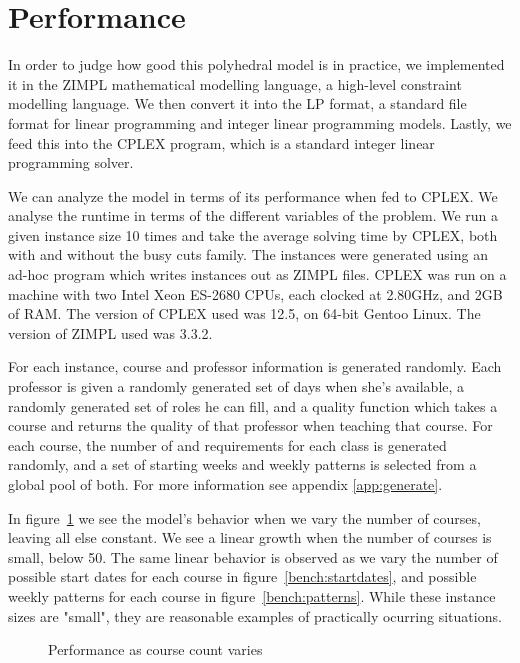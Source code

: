 \newpage
\section{Performance}

In order to judge how good this polyhedral model is in practice, we implemented it in the ZIMPL mathematical modelling language, a high-level constraint modelling language. We then convert it into the LP format, a standard file format for linear programming and integer linear programming models. Lastly, we feed this into the CPLEX program, which is a standard integer linear programming solver.

We can analyze the model in terms of its performance when fed to CPLEX. We analyse the runtime in terms of the different variables of the problem. We run a given instance size 10 times and take the average solving time by CPLEX, both with and without the busy cuts family. The instances were generated using an ad-hoc program which writes instances out as ZIMPL files. CPLEX was run on a machine with two Intel Xeon ES-2680 CPUs, each clocked at 2.80GHz, and 2GB of RAM. The version of CPLEX used was 12.5, on 64-bit Gentoo Linux. The version of ZIMPL used was 3.3.2.

For each instance, course and professor information is generated randomly. Each professor is given a randomly generated set of days when she's available, a randomly generated set of roles he can fill, and a quality function which takes a course and returns the quality of that professor when teaching that course. For each course, the number of and requirements for each class is generated randomly, and a set of starting weeks and weekly patterns is selected from a global pool of both. For more information see appendix \ref{app:generate}.

In figure~\ref{bench:courses} we see the model's behavior when we vary the number of courses, leaving all else constant. We see a linear growth when the number of courses is small, below 50. The same linear behavior is observed as we vary the number of possible start dates for each course in figure~\ref{bench:startdates}, and possible weekly patterns for each course in figure~\ref{bench:patterns}. While these instance sizes are "small", they are reasonable examples of practically ocurring situations.

\begin{figure}
\begin{center}
\caption{Performance as course count varies}
\label{bench:courses}
\end{center}
\end{figure}

